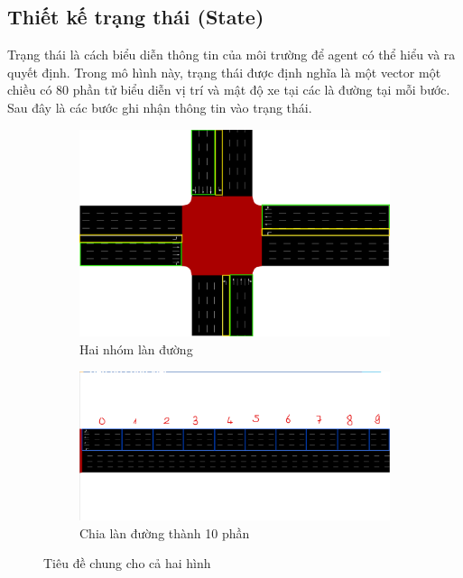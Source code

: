 \subsection{Thiết kế trạng thái (State)}
Trạng thái là cách biểu diễn thông tin của môi trường để agent có thể hiểu và ra quyết định. Trong mô hình này, trạng thái được định nghĩa là một vector một chiều có 80 phần tử biểu diễn vị trí và mật độ xe tại các là đường tại mỗi bước. Sau đây là các bước ghi nhận thông tin vào trạng thái.

\begin{figure}[!htp]
    \centering
    \begin{subfigure}[b]{0.45\textwidth}
        \includegraphics[width=\textwidth]{img/sumo_state_1.png}
        \caption{Hai nhóm làn đường}
        \label{fig:sumo_state_1}
    \end{subfigure}
    \hfill
    \begin{subfigure}[b]{0.45\textwidth}
        \includegraphics[width=\textwidth]{img/sumo_state_2.png}
        \caption{Chia làn đường thành 10 phần}
        \label{fig:sumo_state_2}
    \end{subfigure}
    \caption{Tiêu đề chung cho cả hai hình}
    \label{fig:sumo_state}
\end{figure}


